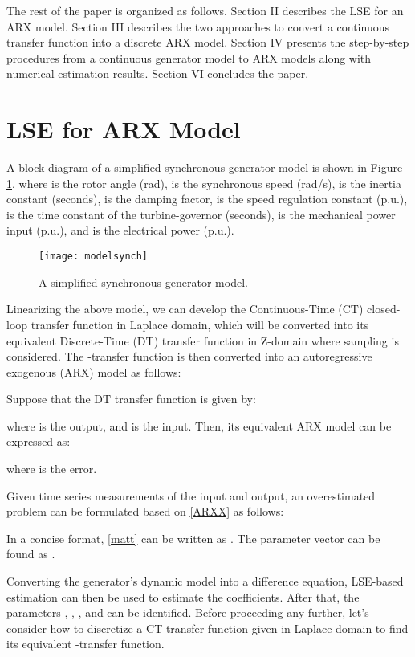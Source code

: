 \documentclass[10pt,journal,final]{IEEEtran}
\begin{document}
The rest of the paper is organized as follows. Section II describes the LSE for an ARX model. Section III describes the two approaches to convert a continuous transfer function into a discrete ARX model. Section IV presents the step-by-step procedures from a continuous generator model to ARX models along with numerical estimation results. Section VI concludes the paper.






\section{LSE for ARX Model}\label{method}
A block diagram of a simplified synchronous generator model is shown in Figure \ref{fig:sys}, where  is the rotor angle (rad),  is the synchronous speed (rad/s), { is the inertia constant (seconds),  is the damping factor,  is the speed regulation constant (p.u.),  is the time constant of the turbine-governor (seconds),}  is the mechanical power input (p.u.), and   is the electrical power (p.u.).
\begin{figure}[h!]
\centering
\texttt{[image: modelsynch]}
\caption{A simplified synchronous generator model.} \label{fig:sys}
\end{figure}

Linearizing the above model, we can develop the Continuous-Time (CT) closed-loop transfer function in Laplace domain, which will be converted into its equivalent Discrete-Time (DT) transfer function in  Z-domain where sampling is considered. The -{transfer} function is then converted into an autoregressive exogenous (ARX) model as follows:

Suppose that the DT transfer function is given by:

where  is the output, and  is the input. Then, its equivalent ARX model can be expressed as:

where  is the error.

Given time series measurements of the input and output, an overestimated problem can be formulated based on \eqref{ARXX} as follows:
\begin{scriptsize}

\end{scriptsize}
In a concise format, \eqref{matt} can be written as . The parameter vector  can be found as .

Converting the generator's dynamic model into a difference equation, LSE-based estimation can then be used to estimate the coefficients. After that, the parameters , , , and  can be identified. Before proceeding any further, let's consider how to discretize a CT transfer function given in Laplace domain to find its equivalent -transfer function.
\end{document}
